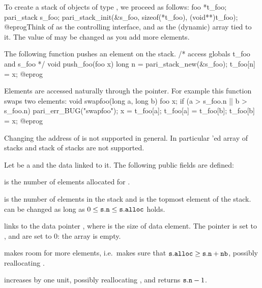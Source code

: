 
To create a stack of objects of type , we proceed as follows:
\bprog
foo *t_foo;
pari_stack s_foo;
pari_stack_init(&s_foo, sizeof(*t_foo), (void**)t_foo);
@eprog\noindent Think of  as the controlling interface, and
 as the (dynamic) array tied to it. The value of 
may be changed as you add more elements.

The following function pushes an element on the stack.
\bprog
/* access globals t_foo and s_foo */
void push_foo(foo x)
{
  long n = pari_stack_new(&s_foo);
  t_foo[n] = x;
}
@eprog


Elements are accessed naturally through the  pointer.
For example this function swaps two elements:
\bprog
void swapfoo(long a, long b)
{
  foo x;
  if (a > s_foo.n || b > s_foo.n) pari_err_BUG("swapfoo");
  x        = t_foo[a];
  t_foo[a] = t_foo[b];
  t_foo[b] = x;
}
@eprog

Changing the address of  is not supported in general.
In particular 'ed array of stacks and stack of stacks are not
supported.

Let  be a  and  the data linked to it. The
following public fields are defined:

\item {} is the number of elements allocated for .

\item {} is the number of elements in the stack and  is
the topmost element of the stack.   can be changed as long as
$0\leq{\tt s.n}\leq{\tt s.alloc}$ holds.

 links
 to the data pointer , where  is the size of
data element. The pointer  is set to ,  and
 are set to $0$: the array is empty.

 makes room for 
more elements, i.e.~makes sure that ${\tt s.alloc}\geq{\tt s.n} + {\tt nb}$,
possibly reallocating .

 increases  by one unit,
possibly reallocating , and returns ${\tt s.n}-1$.

